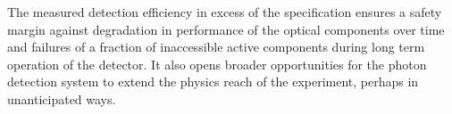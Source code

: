 The measured detection efficiency in excess of the specification ensures a safety margin against degradation in performance of the optical components over time and failures of a fraction of inaccessible active components during long term operation of the detector. It also opens broader opportunities for the photon detection system to extend the physics reach of the experiment, perhaps in unanticipated ways.

